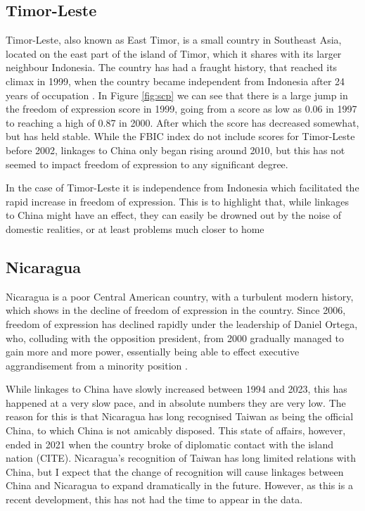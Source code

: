 \subsection{Timor-Leste}
Timor-Leste, also known as East Timor, is a small country in Southeast Asia, located on the east part of the island of Timor, which it shares with its larger neighbour Indonesia. The country has had a fraught history, that reached its climax in 1999, when the country became independent from Indonesia after 24 years of occupation \citep[p. 183]{kingsbury_democratic_2014}. In Figure \ref{fig:scp} we can see that there is a large jump in the freedom of expression score in 1999, going from a score as low as 0.06 in 1997 to reaching a high of 0.87 in 2000. After which the score has decreased somewhat, but has held stable. While the FBIC index do not include scores for Timor-Leste before 2002, linkages to China only began rising around 2010, but this has not seemed to impact freedom of expression to any significant degree.

In the case of Timor-Leste it is independence from Indonesia which facilitated the rapid increase in freedom of expression. This is to highlight that, while linkages to China might have an effect, they can easily be drowned out by the noise of domestic realities, or at least problems much closer to home

\subsection{Nicaragua}
Nicaragua is a poor Central American country, with a turbulent modern history, which shows in the decline of freedom of expression in the country. Since 2006, freedom of expression has declined rapidly under the leadership of Daniel Ortega, who, colluding with the opposition president, from 2000 gradually managed to gain more and more power, essentially being able to effect executive aggrandisement from a minority position \citep{mcconnell_elite_2024}.

While linkages to China have slowly increased between 1994 and 2023, this has happened at a very slow pace, and in absolute numbers they are very low. The reason for this is that Nicaragua has long recognised Taiwan as being the official China, to which China is not amicably disposed. This state of affairs, however, ended in 2021 when the country broke of diplomatic contact with the island nation (CITE). Nicaragua's recognition of Taiwan has long limited relations with China, but I expect that the change of recognition will cause linkages between China and Nicaragua to expand dramatically in the future. However, as this is a recent development, this has not had the time to appear in the data. 

